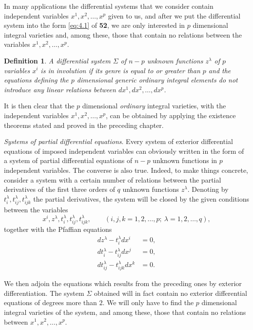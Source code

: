 \documentclass[leqno,11pt]{book}
\numberwithin{equation}{chapter}
\theoremstyle{shape1}
\newtheorem*{dfn*}{\hspace{15pt}Definition}
\theoremstyle{shape0}
\theoremstyle{shape2}
\theoremstyle{definition}
\begin{document}
\fsec In many applications the differential systems that we consider contain independent variables $x^{1},x^{2},\dots,x^{p}$ given to us, and after we put the differential system into the form \eqref{eq:4.1} of \textsection\textbf{52}, we are only interested in $p$ dimensional integral varieties and, among these, those that contain no relations between the variables $x^{1},x^{2},\dots,x^{p}$.
\begin{dfn*}
  A differential system $\Sigma$ of $n-p$ unknown functions $z^{\lambda}$ of $p$ variables $x^{i}$ is in involution if its genre is equal to or greater than $p$ and  the equations defining the $p$ dimensional generic ordinary integral elements do not introduce any linear relations between $dx^{1},dx^{2},\dots,dx^{p}$.
\end{dfn*}
It is then clear that the $p$ dimensional \emph{ordinary} integral varieties, with the independent variables $x^{1},x^{2},\dots,x^{p}$, can be obtained by applying the existence theorems stated and proved in the preceding chapter. 

\vspace{12pt}\fsec \emph{Systems of partial differential equations}. Every system of exterior differential equations of imposed independent variables can obviously written in the form of a system of partial differential equations of $n-p$ unknown functions in $p$ independent variables. The converse is also true. Indeed, to make things concrete, consider a system with a certain number of relations between  the partial derivatives of the first three orders of $q$ unknown functions $z^{\lambda}$. Denoting by $t_{i}^{\lambda},t_{ij}^{\lambda},t_{ijk}^{\lambda}$ the partial derivatives, the system will be closed by the given conditions between the variables
\[
x^{i},z^{\lambda},t_{i}^{\lambda},t_{ij}^{\lambda},t_{ijk}^{\lambda},\qquad(i,j,k=1,2,\dots,p;\ \lambda=1,2,\dots,q),
\]
together with the Pfaffian equations
\begin{align*}
  dz^{\lambda}-t_{i}^{\lambda}dx^{i}&=0,\\
  dt_{i}^{\lambda}-t_{ij}^{\lambda}dx^{j}&=0,\\
  dt_{ij}^{\lambda}-t_{ijk}^{\lambda}dx^{k}&=0.
\end{align*}

We then adjoin the equations which results from the preceding ones by exterior differentiation. The system $\Sigma$ obtained will in fact contain no exterior differential equations of degrees more than $2$. We will only have to find the $p$ dimensional integral varieties of the system, and among these, those that contain no relations between $x^{1},x^{2},\dots,x^{p}$.
\end{document}

